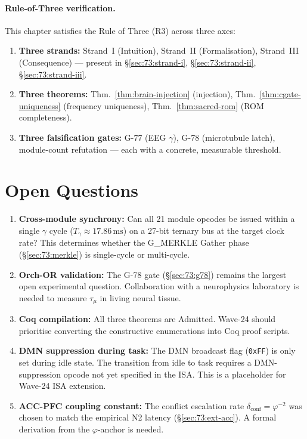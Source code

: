 \paragraph{Rule-of-Three verification.}
This chapter satisfies the Rule of Three (R3) across three axes:
\begin{enumerate}
  \item \textbf{Three strands:}
    Strand~I (Intuition), Strand~II (Formalisation),
    Strand~III (Consequence) --- present in §\ref{sec:73:strand-i},
    §\ref{sec:73:strand-ii}, §\ref{sec:73:strand-iii}.
  \item \textbf{Three theorems:}
    Thm.~\ref{thm:brain-injection} (injection),
    Thm.~\ref{thm:cgate-uniqueness} (frequency uniqueness),
    Thm.~\ref{thm:sacred-rom} (ROM completeness).
  \item \textbf{Three falsification gates:}
    G-77 (EEG $\gamma$), G-78 (microtubule latch),
    module-count refutation --- each with a concrete, measurable
    threshold.
\end{enumerate}

\section{Open Questions}
\label{sec:73:open}

\begin{enumerate}
  \item \textbf{Cross-module synchrony:}
    Can all 21 module opcodes be issued within a single
    $\gamma$ cycle ($T_\gamma \approx 17.86\,\mathrm{ms}$)
    on a 27-bit ternary bus at the target clock rate?
    This determines whether the G\_MERKLE Gather phase
    (§\ref{sec:73:merkle}) is single-cycle or multi-cycle.

  \item \textbf{Orch-OR validation:}
    The G-78 gate (§\ref{sec:73:g78}) remains the largest open
    experimental question.
    Collaboration with a neurophysics laboratory is needed to
    measure $\tau_\mu$ in living neural tissue.

  \item \textbf{Coq compilation:}
    All three theorems are Admitted.
    Wave-24 should prioritise converting the constructive
    enumerations into Coq proof scripts.

  \item \textbf{DMN suppression during task:}
    The DMN broadcast flag (\texttt{0xFF}) is only set during
    idle state.
    The transition from idle to task requires a DMN-suppression
    opcode not yet specified in the ISA.
    This is a placeholder for Wave-24 ISA extension.

  \item \textbf{ACC-PFC coupling constant:}
    The conflict escalation rate $\delta_\mathrm{conf} = \varphi^{-2}$
    was chosen to match the empirical N2 latency (§\ref{sec:73:ext-acc}).
    A formal derivation from the $\varphi$-anchor is needed.
\end{enumerate}

